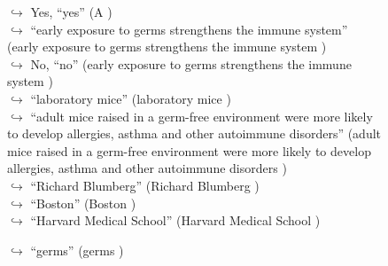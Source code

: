 \documentclass[11pt,a4paper, onecolumn]{article}
\begin{document}
\begin{figure}[t] \small \begin{tcolorbox}[boxsep=0pt,left=5pt,right=0pt,top=2pt,colback = yellow!5] \begin{dialogue}
 \small 
\colorbox{pink!25}{$\hookrightarrow$}
\colorbox{red!25}{Yes,}
{ ``yes'' (A ) }
\\
\colorbox{pink!25}{$\hookrightarrow$}
{ ``early exposure to germs strengthens the immune system'' (early exposure to germs strengthens the immune system ) }
\\
\colorbox{pink!25}{$\hookrightarrow$}
\colorbox{red!25}{No,}
{ ``no'' (early exposure to germs strengthens the immune system ) }
\\
\colorbox{pink!25}{$\hookrightarrow$}
{ ``laboratory mice'' (laboratory mice ) }
\\
\colorbox{pink!25}{$\hookrightarrow$}
{ ``adult mice raised in a germ-free environment were more likely to develop allergies, asthma and other autoimmune disorders'' (adult mice raised in a germ-free environment were more likely to develop allergies, asthma and other autoimmune disorders ) }
\\
\colorbox{pink!25}{$\hookrightarrow$}
{ ``Richard Blumberg'' (Richard Blumberg ) }
\\
\colorbox{pink!25}{$\hookrightarrow$}
{ ``Boston'' (Boston ) }
\\
\colorbox{pink!25}{$\hookrightarrow$}
{ ``Harvard Medical School'' (Harvard Medical School ) }
 \end{dialogue}\end{tcolorbox}\end{figure}\begin{figure}[t] \small \begin{tcolorbox}[boxsep=0pt,left=5pt,right=0pt,top=2pt,colback = yellow!5] \begin{dialogue}
 \small 
\colorbox{pink!25}{$\hookrightarrow$}
{ ``germs'' (germs ) }
\\

\end{dialogue}
\end{tcolorbox}
\end{figure}
\end{document}
